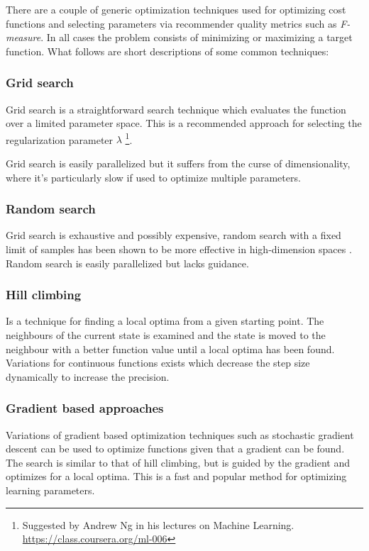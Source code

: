 There are a couple of generic optimization techniques used for optimizing cost functions and selecting parameters via recommender quality metrics such as \textit{F-measure}. In all cases the problem consists of minimizing or maximizing a target function. What follows are short descriptions of some common techniques:


\subsubsection{Grid search}

Grid search is a straightforward search technique which evaluates the function over a limited parameter space. This is a recommended approach for selecting the regularization parameter $\lambda$
\footnote{Suggested by Andrew Ng in his lectures on Machine Learning. \url{https://class.coursera.org/ml-006}}.

Grid search is easily parallelized but it suffers from the curse of dimensionality, where it's particularly slow if used to optimize multiple parameters.


\subsubsection{Random search}

Grid search is exhaustive and possibly expensive, random search with a fixed limit of samples has been shown to be more effective in high-dimension spaces \citep{bergstra2012random}. Random search is easily parallelized but lacks guidance.


\subsubsection{Hill climbing}

Is a technique for finding a local optima from a given starting point. The neighbours of the current state is examined and the state is moved to the neighbour with a better function value until a local optima has been found. Variations for continuous functions exists which decrease the step size dynamically to increase the precision. \citep{norvigAI}


\subsubsection{Gradient based approaches}

Variations of gradient based optimization techniques such as stochastic gradient descent can be used to optimize functions given that a gradient can be found. The search is similar to that of hill climbing, but is guided by the gradient and optimizes for a local optima.  This is a fast and popular method for optimizing learning parameters.
\cite{hu2008collaborative}


